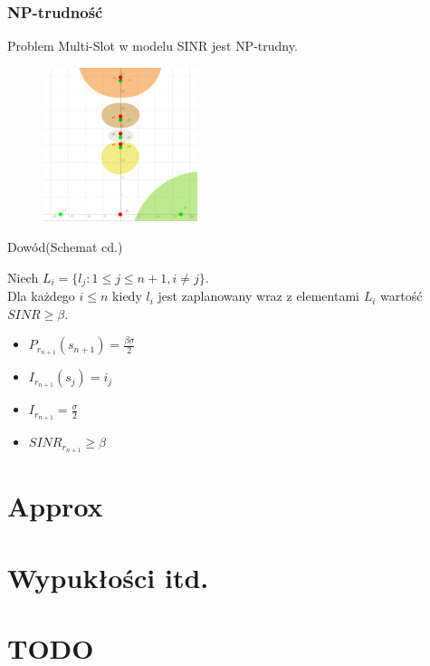 \documentclass[polish, t,10pt]{beamer}
\begin{document}
\begin{frame}
    \frametitle{NP-trudność}
    \begin{theorem}
        Problem Multi-Slot w modelu SINR jest NP-trudny.
    \end{theorem}
    \begin{figure}
        \includegraphics[width=0.4\textwidth]{pictures/np-placement3.png}
    \end{figure}
    \begin{block}{Dowód(Schemat cd.)}
        \begin{lemma}
            Niech $L_i = \{l_j: 1 \leq j \leq n + 1, i \neq j\}$.\\
            Dla każdego $i \leq n$ kiedy $l_i$ jest zaplanowany wraz z elementami $L_i$ wartość $SINR \ge \beta$.
        \end{lemma}
        \begin{itemize}
            \item $P_{r_{n+1}}(s_{n+1}) = \frac{\beta\sigma}{2}$
            \item $I_{r_{n+1}}(s_j) = i_j$
            \item $I_{r_{n+1}} = \frac{\sigma}{2}$
            \item $SINR_{r_{n+1}} \geq \beta$
        \end{itemize}
    \end{block}
\end{frame}

\section{Approx}
\section{Wypukłości itd.}
\section{TODO}
\end{document}
